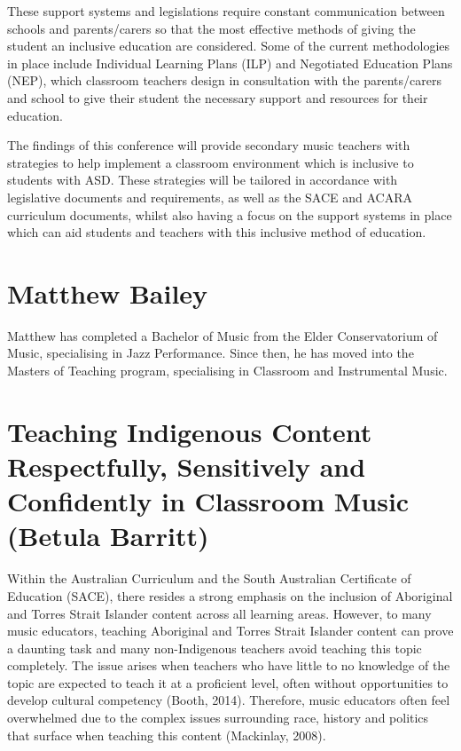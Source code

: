 \documentclass[twoside,14pt,a4paper,notitlepage]{memoir}
\begin{document}
These support systems and legislations require constant communication between schools and parents/carers so that the most effective methods of giving the student an inclusive education are considered. Some of the current methodologies in place include Individual Learning Plans (ILP) and Negotiated Education Plans (NEP), which classroom teachers design in consultation with the parents/carers and school to give their student the necessary support and resources for their education.

The findings of this conference will provide secondary music teachers with strategies to help implement a classroom environment which is inclusive to students with ASD. These strategies will be tailored in accordance with legislative documents and requirements, as well as the SACE and ACARA curriculum documents, whilst also having a focus on the support systems in place which can aid students and teachers with this inclusive method of education.

\section*{Matthew Bailey}

Matthew has completed a Bachelor of Music from the Elder Conservatorium of Music, specialising in Jazz Performance. Since then, he has moved into the Masters of Teaching program, specialising in Classroom and Instrumental Music.


\section*{Teaching Indigenous Content Respectfully, Sensitively and Confidently in Classroom Music (Betula Barritt)}
\label{aut:barritt}

Within the Australian Curriculum and the South Australian Certificate of Education (SACE), there resides a strong emphasis on the inclusion of Aboriginal and Torres Strait Islander content across all learning areas. However, to many music educators, teaching Aboriginal and Torres Strait Islander content can prove a daunting task and many non-Indigenous teachers avoid teaching this topic completely. The issue arises when teachers who have little to no knowledge of the topic are expected to teach it at a proficient level, often without opportunities to develop cultural competency (Booth, 2014). Therefore, music educators often feel overwhelmed due to the complex issues surrounding race, history and politics that surface when teaching this content (Mackinlay, 2008).
\end{document}
